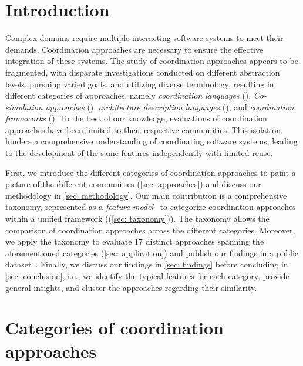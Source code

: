 \documentclass[runningheads]{llncs}
\begin{document}
\section{Introduction} \label{sec: introduction}
Complex domains require multiple interacting software systems to meet their demands. 
Coordination approaches are necessary to ensure the effective integration of these systems.
The study of coordination approaches appears to be fragmented, with disparate investigations conducted on different abstraction levels, pursuing varied goals, and utilizing diverse terminology, resulting in different categories of approaches, namely \textit{coordination languages} (\cite{papadopoulosCoordinationModelsLanguages1998}), \textit{Co-simulation approaches} (\cite{gomesCoSimulationSurvey2019}), \textit{architecture description languages} (\cite{clementsSurveyArchitectureDescription1996}), and \textit{coordination frameworks} (\cite{krauterBehavioralConsistencyMultimodeling2023,varalarsenBehavioralCoordinationOperator2015}).
To the best of our knowledge, evaluations of coordination approaches have been limited to their respective communities.
This isolation hinders a comprehensive understanding of coordinating software systems, leading to the development of the same features independently with limited reuse.

First, we introduce the different categories of coordination approaches to paint a picture of the different communities (\autoref{sec: approaches}) and discuss our methodology in \autoref{sec: methodology}.
Our main contribution is a comprehensive taxonomy, represented as a \textit{feature model}~\cite{kangFeatureOrientedDomainAnalysis1990} to categorize coordination approaches within a unified framework ((\autoref{sec: taxonomy})).
The taxonomy allows the comparison of coordination approaches across the different categories.
Moreover, we apply the taxonomy to evaluate 17 distinct approaches spanning the aforementioned categories (\autoref{sec: application}) and publish our findings in a public dataset~\cite{timkrauterArtifactsCoordination2024}.
Finally, we discuss our findings in \autoref{sec: findings} before concluding in \autoref{sec: conclusion}, i.e., we identify the typical features for each category, provide general insights, and cluster the approaches regarding their similarity.

\section{Categories of coordination approaches} \label{sec: approaches}
\end{document}
